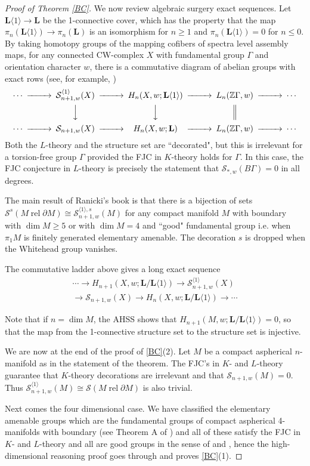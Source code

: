 \documentclass[12pt]{amsart}
\theoremstyle{definition}
\newcommand{\g}{\Gamma}
\newcommand{\Z}{\mathbb Z}
\DeclareMathOperator{\rel}{rel}
\newcommand{\cS}{\mathcal S}
\newcommand{\bfL}{\mathbf L}
\begin{document}
\begin{proof}[Proof of Theorem \ref{BC}]
We now review algebraic surgery exact sequences.     Let $\bfL\langle 1 \rangle \to \bfL$ be the 1-connective cover, which has the property that the map $\pi_n(\bfL\langle 1 \rangle) \to \pi_n(\bfL)$ is an isomorphism for $n \geq 1$ and $\pi_n(\bfL\langle 1 \rangle) = 0$ for $n \leq 0$.  By taking homotopy groups of the mapping cofibers of spectra level assembly maps,  for any connected  CW-complex $X$ with fundamental group $\g$ and orientation character $w$, there is  a commutative diagram of abelian groups with exact rows (see, for example, \cite[Definition 14.6]{R92})
$$
\begin{CD}
\cdots @>>> \cS^{\langle 1 \rangle}_{n+1,w}(X) @>>> H_n(X,w; \bfL\langle 1 \rangle) @>>> L_n(\Z\g,w)  @>>> \cdots \\
@. @VVV @VVV @| @.\\
\cdots @>>> \cS_{n+1,w}(X) @>>> H_n(X,w; \bfL) @>>> L_n(\Z\g,w)  @>>> \cdots 
\end{CD}
$$
Both the $L$-theory and the structure set are ``decorated", but this is irrelevant for a torsion-free group $\g$ provided the FJC in $K$-theory holds for $\g$.   In this case, 
the FJC conjecture in $L$-theory is precisely the statement that $\cS_{*,w}(B\g)=0$ in all degrees.

The main result of Ranicki's book \cite[Theorem 18.5]{R92} is that there is a bijection of sets $\cS^s(M \rel \partial M) \cong \cS^{\langle 1 \rangle,s}_{n+1,w}(M)$ for any compact manifold $M$ with boundary with $\dim M \geq 5$ or with $\dim M = 4$ and  ``good" fundamental group i.e. when $\pi_1M$ is finitely generated elementary amenable.   The decoration $s$ is dropped when the Whitehead group vanishes.

The commutative ladder above gives a long exact sequence 
\begin{multline} \label{one-connective-cover}
\cdots \to H_{n+1}(X,w; \bfL/\bfL\langle 1 \rangle) \to 
\cS^{\langle 1 \rangle}_{n+1,w}(X) \\ \to \cS_{n+1,w}(X) \to H_n(X,w; \bfL/\bfL\langle 1 \rangle) \to \cdots
\end{multline}



Note that if $n = \dim M$, the AHSS shows that $H_{n+1}(M,w; \bfL/\bfL\langle 1 \rangle) = 0$, so that the map from the 1-connective structure set to the structure set is injective.   

We are now at the end of the proof of \ref{BC}(2).  Let $M$ be a compact aspherical $n$-manifold as in the statement of the theorem.  The FJC's in $K$- and $L$-theory guarantee that $K$-theory decorations are irrelevant and that $\cS_{n+1,w}(M) = 0$.   Thus $\cS_{n+1,w}^{\langle 1 \rangle}(M) \cong \cS(M \rel \partial M)$ is also trivial.   

Next comes the four dimensional case.    We have classified the elementary amenable groups which are the fundamental groups of compact aspherical 4-manifolds with boundary (see Theorem A of \cite{DH2}) and all of these satisfy the FJC in $K$- and $L$-theory and all are good groups in the sense of \cite{FQ} and \cite{BKKPR}, hence the high-dimensional reasoning proof goes through and proves  \ref{BC}(1).  
\end{proof}
\end{document}
